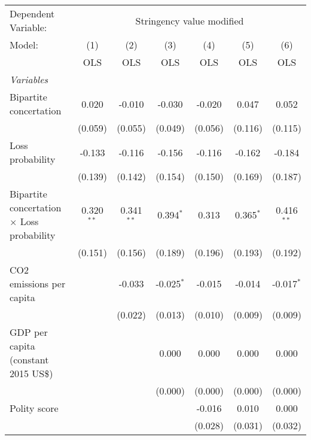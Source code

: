 
\begingroup
\centering
\begin{tabular}{lcccccc}
   \toprule
   Dependent Variable: & \multicolumn{6}{c}{Stringency value modified}\\
   Model:                                            & (1)          & (2)          & (3)          & (4)     & (5)         & (6)\\  
                                                     &  OLS         & OLS          & OLS          & OLS     & OLS         & OLS\\  
   \midrule
   \emph{Variables}\\
   Bipartite concertation                            & 0.020        & -0.010       & -0.030       & -0.020  & 0.047       & 0.052\\   
                                                     & (0.059)      & (0.055)      & (0.049)      & (0.056) & (0.116)     & (0.115)\\   
   Loss probability                                  & -0.133       & -0.116       & -0.156       & -0.116  & -0.162      & -0.184\\   
                                                     & (0.139)      & (0.142)      & (0.154)      & (0.150) & (0.169)     & (0.187)\\   
   Bipartite concertation $\times$ Loss probability  & 0.320$^{**}$ & 0.341$^{**}$ & 0.394$^{*}$  & 0.313   & 0.365$^{*}$ & 0.416$^{**}$\\   
                                                     & (0.151)      & (0.156)      & (0.189)      & (0.196) & (0.193)     & (0.192)\\   
   CO2 emissions per capita                          &              & -0.033       & -0.025$^{*}$ & -0.015  & -0.014      & -0.017$^{*}$\\   
                                                     &              & (0.022)      & (0.013)      & (0.010) & (0.009)     & (0.009)\\   
   GDP per capita (constant 2015 US\$)               &              &              & 0.000        & 0.000   & 0.000       & 0.000\\   
                                                     &              &              & (0.000)      & (0.000) & (0.000)     & (0.000)\\   
   Polity score                                      &              &              &              & -0.016  & 0.010       & 0.000\\   
                                                     &              &              &              & (0.028) & (0.031)     & (0.032)\\   

\end{tabular}
